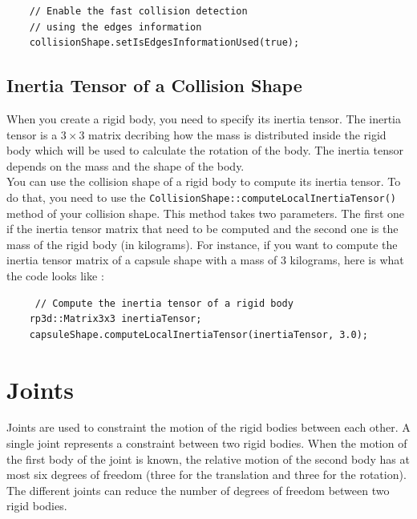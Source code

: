 \documentclass[a4paper,12pt]{article}
\begin{document}
     \begin{lstlisting}
    // Enable the fast collision detection
    // using the edges information
    collisionShape.setIsEdgesInformationUsed(true);
  \end{lstlisting}

    \subsection{Inertia Tensor of a Collision Shape}
    \label{sec:inertiacollisionshape}

    When you create a rigid body, you need to specify its inertia tensor. The inertia tensor is a $3 \times 3$ matrix decribing how the mass is distributed inside the rigid body which
    will be used to calculate the rotation of the body. The inertia tensor depends on the mass and the shape of the body. \\

    You can use the collision shape of a rigid body to compute its inertia tensor. To do that, you need to use the \texttt{CollisionShape::computeLocalInertiaTensor()} method of your collision
    shape. This method takes two parameters. The first one if the inertia tensor matrix that need to be computed and the second one is the mass of the rigid body (in kilograms). For instance,
    if you want to compute the inertia tensor matrix of a capsule shape with a mass of 3 kilograms, here is what the code looks like : \\

    \begin{lstlisting}
     // Compute the inertia tensor of a rigid body
    rp3d::Matrix3x3 inertiaTensor;
    capsuleShape.computeLocalInertiaTensor(inertiaTensor, 3.0);
  \end{lstlisting}

    \section{Joints}

    Joints are used to constraint the motion of the rigid bodies between each other. A single joint represents a constraint between two rigid bodies.
    When the motion of the first body of the joint is known, the relative motion of the second body has at most six degrees of freedom (three for the
    translation and three for the rotation). The different joints can reduce the number of degrees of freedom between two rigid bodies. \\
\end{document}
